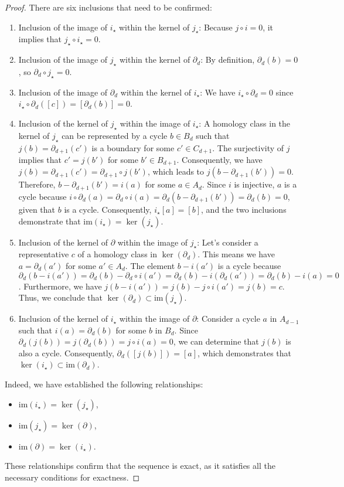 \documentclass{amsart}
\begin{document}
\begin{proof}
There are six inclusions that need to be confirmed:
\begin{enumerate}
	\item Inclusion of the image of $i_\star$ within the kernel of $j_\star$: Because $j\circ i = 0$, it implies that $j_\star \circ i_\star = 0$.
	\item Inclusion of the image of $j_\star$ within the kernel of $\partial_d$: By definition, $\partial_d(b) = 0$, so $\partial_d \circ j_\star = 0$.
	\item Inclusion of the image of $\partial_d$ within the kernel of $i_\star$: We have $i_\star \circ \partial_d = 0$ since $i_\star \circ \partial_d([c]) = [\partial_d(b)] = 0$.
	\item Inclusion of the kernel of $j_\star$ within the image of $i_\star$: A homology class in the kernel of $j_\star$ can be represented by a cycle $b \in B_d$ such that $j(b) = \partial_{d+1}(c')$ is a boundary for some $c' \in C_{d+1}$. The surjectivity of $j$ implies that $c' = j(b')$ for some $b' \in B_{d+1}$. Consequently, we have $j(b) = \partial_{d+1}(c') = \partial_{d+1} \circ j(b')$, which leads to $j(b - \partial_{d+1}(b')) = 0$. Therefore, $b - \partial_{d+1}(b') = i(a)$ for some $a \in A_d$. Since $i$ is injective, $a$ is a cycle because $i \circ \partial_d(a) = \partial_d \circ i(a) = \partial_d(b - \partial_{d+1}(b')) = \partial_{d}(b) = 0$, given that $b$ is a cycle. Consequently, $i_\star[a] = [b]$, and the two inclusions demonstrate that $\text{im}(i_\star) = \ker(j_\star)$.
	\item Inclusion of the kernel of $\partial$ within the image of $j_\star$: Let's consider a representative $c$ of a homology class in $\ker(\partial_d)$. This means we have $a = \partial_d(a')$ for some $a' \in A_d$. The element $b - i(a')$ is a cycle because $\partial_d(b - i(a')) = \partial_d(b) - \partial_d \circ i(a') = \partial_d(b) - i(\partial_d(a')) = \partial_d(b) - i(a) = 0$. Furthermore, we have $j(b - i(a')) = j(b) - j \circ i(a') = j(b) = c$. Thus, we conclude that $\ker(\partial_d) \subset \text{im}(j_\star)$.
	\item Inclusion of the kernel of $i_\star$ within the image of $\partial$: Consider a cycle $a$ in $A_{d-1}$ such that $i(a) = \partial_d(b)$ for some $b$ in $B_d$. Since $\partial_d(j(b)) = j(\partial_d(b)) = j \circ i(a) = 0$, we can determine that $j(b)$ is also a cycle. Consequently, $\partial_d([j(b)]) = [a]$, which demonstrates that $\ker(i_\star) \subset \text{im}(\partial_d)$.
\end{enumerate}
Indeed, we have established the following relationships:
\begin{itemize}
    \item $\text{im}(i_\star) = \ker(j_\star)$,
    \item $\text{im}(j_\star) = \ker(\partial)$,
    \item $\text{im}(\partial) = \ker(i_\star)$.
\end{itemize}
These relationships confirm that the sequence is exact, as it satisfies all the necessary conditions for exactness.\end{proof}
\end{document}
